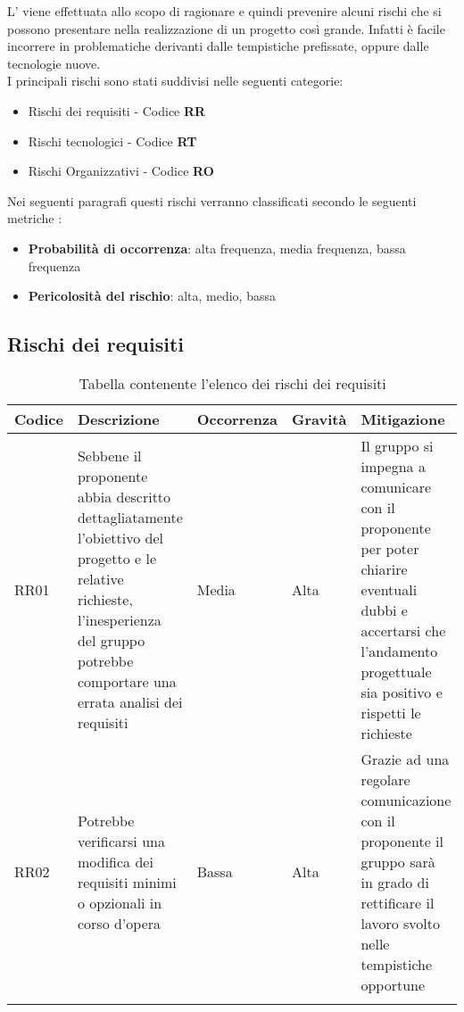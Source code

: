 \documentclass[../piano_di_progetto.tex]{subfiles}
\begin{document}
L’  viene effettuata allo scopo di ragionare e quindi prevenire alcuni rischi che si possono presentare nella realizzazione di un progetto così grande. Infatti è facile incorrere in problematiche derivanti dalle tempistiche prefissate, oppure dalle tecnologie nuove.\\
I principali rischi sono stati suddivisi nelle seguenti categorie:
\begin{itemize}
\item Rischi dei requisiti - Codice \textbf{RR}
\item Rischi tecnologici  - Codice \textbf{RT}
\item Rischi Organizzativi - Codice \textbf{RO}
\end{itemize}
Nei seguenti paragrafi questi rischi verranno classificati secondo le seguenti metriche :
\begin{itemize}
\item \textbf{Probabilità di occorrenza}: alta frequenza, media frequenza, bassa frequenza
\item \textbf{Pericolosità del rischio}: alta, medio, bassa
\end{itemize}

\subsection{Rischi dei requisiti}%
\label{sub:rischi_req}

\begin{center}
	\begin{longtable}{|p{1.6cm}|p{3.5cm}|p{2cm}|p{2cm}|p{3.5cm}|}
		\hline
		\rowcolor{lightgray}
		{\textbf{Codice}} & {\textbf{Descrizione}} & {\textbf{Occorrenza}} & {\textbf{Gravità}} & {\textbf{Mitigazione}} \\

		\hline
			RR01 &
			Sebbene il proponente abbia descritto dettagliatamente l’obiettivo del progetto e le relative richieste, l’inesperienza del gruppo potrebbe comportare una errata analisi dei requisiti
			&
			Media
			& 
			Alta
			&
			Il gruppo si impegna a comunicare con il proponente per poter chiarire eventuali dubbi e accertarsi che l’andamento progettuale sia positivo e rispetti le richieste\\
			
			\hline
			RR02 &
			Potrebbe verificarsi una modifica dei requisiti minimi o opzionali in corso d’opera
			&
			Bassa
			& 
			Alta
			& 
			Grazie ad una regolare comunicazione con il proponente il gruppo sarà in grado di rettificare il lavoro svolto nelle tempistiche opportune\\
			\hline
			\rowcolor{white}
\caption{Tabella contenente l'elenco dei rischi dei requisiti}
	\end{longtable}

\end{center}
\end{document}
